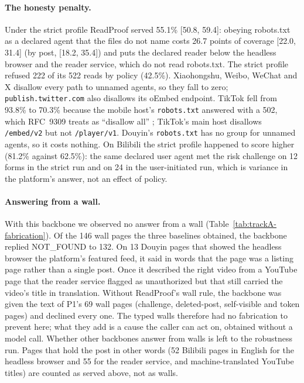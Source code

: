 \paragraph{The honesty penalty.}
Under the strict profile ReadProof served 55.1\% [50.8, 59.4]: obeying robots.txt as a declared agent that the files
do not name costs 26.7 points of coverage [22.0, 31.4] (by post, [18.2, 35.4]) and puts the declared reader below the
headless browser and the reader service, which do not read robots.txt. The strict profile refused 222 of its 522
reads by policy (42.5\%). Xiaohongshu, Weibo, WeChat and X disallow every path to unnamed agents, so they fall to
zero; \texttt{publish.twitter.com} also disallows its oEmbed endpoint. TikTok fell from 93.8\% to 70.3\% because the
mobile host's \texttt{robots.txt} answered with a 502, which RFC~9309 treats as ``disallow all'' \citep{rfc9309};
TikTok's main host disallows \texttt{/embed/v2} but not \texttt{/player/v1}. Douyin's \texttt{robots.txt} has no group
for unnamed agents, so it costs nothing. On Bilibili the strict profile happened to score higher (81.2\% against
62.5\%): the same declared user agent met the risk challenge on 12 forms in the strict run and on 24 in the
user-initiated run, which is variance in the platform's answer, not an effect of policy.



\paragraph{Answering from a wall.}
With this backbone we observed no answer from a wall (Table~\ref{tab:trackA-fabrication}). Of the 146 wall pages the
three baselines obtained, the backbone replied NOT\_FOUND to 132. On 13 Douyin pages that showed the headless browser
the platform's featured feed, it said in words that the page was a listing page rather than a single post. Once it
described the right video from a YouTube page that the reader service flagged as unauthorized but that still carried
the video's title in translation. Without ReadProof's wall rule, the backbone was given the text of P1's 69 wall
pages (challenge, deleted-post, self-visible and token pages) and declined every one. The typed walls therefore had
no fabrication to prevent here; what they add is a cause the caller can act on, obtained without a model call.
Whether other backbones answer from walls is left to the robustness run. Pages that hold the post in other words (52
Bilibili pages in English for the headless browser and 55 for the reader service, and machine-translated YouTube
titles) are counted as served above, not as walls.

